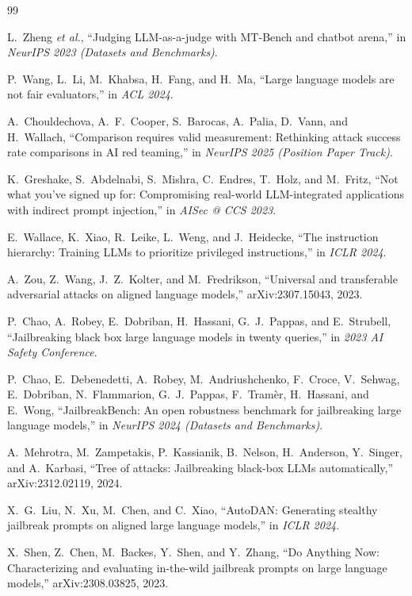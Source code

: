 \documentclass[conference]{IEEEtran}
\begin{document}
\begin{thebibliography}{99}

 L.~Zheng \textit{et al.}, ``Judging LLM-as-a-judge with MT-Bench and chatbot arena,'' in \textit{NeurIPS 2023 (Datasets and Benchmarks)}.

 P.~Wang, L.~Li, M.~Khabsa, H.~Fang, and H.~Ma, ``Large language models are not fair evaluators,'' in \textit{ACL 2024}.

 A.~Chouldechova, A.~F.~Cooper, S.~Barocas, A.~Palia, D.~Vann, and H.~Wallach, ``Comparison requires valid measurement: Rethinking attack success rate comparisons in AI red teaming,'' in \textit{NeurIPS 2025 (Position Paper Track)}.

 K.~Greshake, S.~Abdelnabi, S.~Mishra, C.~Endres, T.~Holz, and M.~Fritz, ``Not what you've signed up for: Compromising real-world LLM-integrated applications with indirect prompt injection,'' in \textit{AISec @ CCS 2023}.

 E.~Wallace, K.~Xiao, R.~Leike, L.~Weng, and J.~Heidecke, ``The instruction hierarchy: Training LLMs to prioritize privileged instructions,'' in \textit{ICLR 2024}.

 A.~Zou, Z.~Wang, J.~Z.~Kolter, and M.~Fredrikson, ``Universal and transferable adversarial attacks on aligned language models,'' arXiv:2307.15043, 2023.

 P.~Chao, A.~Robey, E.~Dobriban, H.~Hassani, G.~J.~Pappas, and E.~Strubell, ``Jailbreaking black box large language models in twenty queries,'' in \textit{2023 AI Safety Conference}.

 P.~Chao, E.~Debenedetti, A.~Robey, M.~Andriushchenko, F.~Croce, V.~Sehwag, E.~Dobriban, N.~Flammarion, G.~J.~Pappas, F.~Tram{\`er}, H.~Hassani, and E.~Wong, ``JailbreakBench: An open robustness benchmark for jailbreaking large language models,'' in \textit{NeurIPS 2024 (Datasets and Benchmarks)}.

 A.~Mehrotra, M.~Zampetakis, P.~Kassianik, B.~Nelson, H.~Anderson, Y.~Singer, and A.~Karbasi, ``Tree of attacks: Jailbreaking black-box LLMs automatically,'' arXiv:2312.02119, 2024.

 X.~G.~Liu, N.~Xu, M.~Chen, and C.~Xiao, ``AutoDAN: Generating stealthy jailbreak prompts on aligned large language models,'' in \textit{ICLR 2024}.

 X.~Shen, Z.~Chen, M.~Backes, Y.~Shen, and Y.~Zhang, ``Do Anything Now: Characterizing and evaluating in-the-wild jailbreak prompts on large language models,'' arXiv:2308.03825, 2023.


\end{thebibliography}
\end{document}
